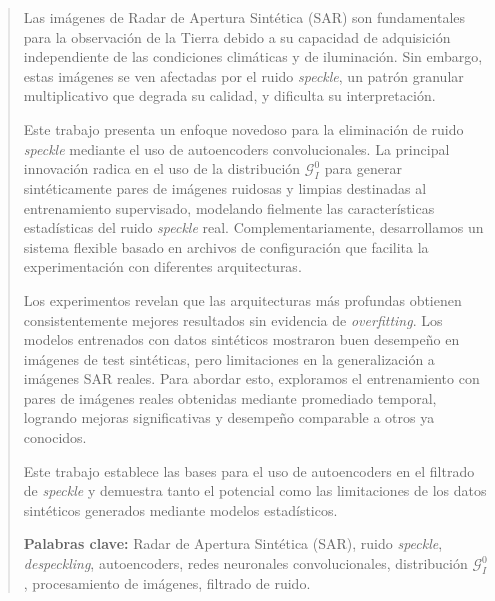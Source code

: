 \begin{abstract}

Las imágenes de Radar de Apertura Sintética (SAR) son fundamentales para la observación de la Tierra debido a su capacidad de adquisición independiente de las condiciones climáticas y de iluminación. Sin embargo, estas imágenes se ven afectadas por el ruido \emph{speckle}, un patrón granular multiplicativo que degrada su calidad, y dificulta su interpretación.

Este trabajo presenta un enfoque novedoso para la eliminación de ruido \emph{speckle} mediante el uso de autoencoders convolucionales. La principal innovación radica en el uso de la distribución $\mathcal{G}_I^0$ para generar sintéticamente pares de imágenes ruidosas y limpias destinadas al entrenamiento supervisado, modelando fielmente las características estadísticas del ruido \emph{speckle} real. Complementariamente, desarrollamos un sistema flexible basado en archivos de configuración que facilita la experimentación con diferentes arquitecturas.

Los experimentos revelan que las arquitecturas más profundas obtienen consistentemente mejores resultados sin evidencia de \emph{overfitting}. Los modelos entrenados con datos sintéticos mostraron buen desempeño en imágenes de test sintéticas, pero limitaciones en la generalización a imágenes SAR reales. Para abordar esto, exploramos el entrenamiento con pares de imágenes reales obtenidas mediante promediado temporal, logrando mejoras significativas y desempeño comparable a otros ya conocidos.

Este trabajo establece las bases para el uso de autoencoders en el filtrado de \emph{speckle} y demuestra tanto el potencial como las limitaciones de los datos sintéticos generados mediante modelos estadísticos.

\vspace{0.5cm}

\noindent\textbf{Palabras clave:} Radar de Apertura Sintética (SAR), ruido \emph{speckle}, \emph{despeckling}, autoencoders, redes neuronales convolucionales, distribución $\mathcal{G}_I^0$, procesamiento de imágenes, filtrado de ruido.

\end{abstract}